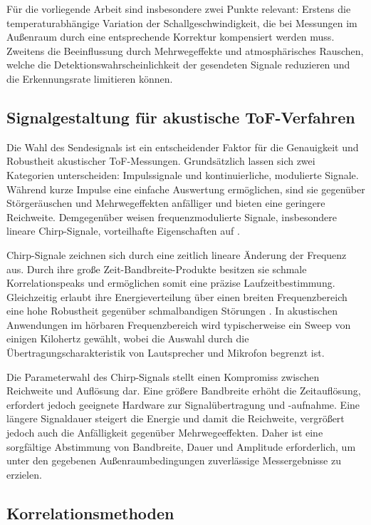 Für die vorliegende Arbeit sind insbesondere zwei Punkte relevant: Erstens die temperaturabhängige Variation der Schallgeschwindigkeit, die bei Messungen im Außenraum durch eine entsprechende Korrektur kompensiert werden muss. Zweitens die Beeinflussung durch Mehrwegeffekte und atmosphärisches Rauschen, welche die Detektionswahrscheinlichkeit der gesendeten Signale reduzieren und die Erkennungsrate limitieren können.


\subsection{Signalgestaltung für akustische \ac{ToF}-Verfahren}

Die Wahl des Sendesignals ist ein entscheidender Faktor für die Genauigkeit und Robustheit akustischer \ac{ToF}-Messungen. Grundsätzlich lassen sich zwei Kategorien unterscheiden: Impulssignale und kontinuierliche, modulierte Signale. Während kurze Impulse eine einfache Auswertung ermöglichen, sind sie gegenüber Störgeräuschen und Mehrwegeffekten anfälliger und bieten eine geringere Reichweite. Demgegenüber weisen frequenzmodulierte Signale, insbesondere lineare Chirp-Signale, vorteilhafte Eigenschaften auf \cite{cook1960pulse}.

Chirp-Signale zeichnen sich durch eine zeitlich lineare Änderung der Frequenz aus. Durch ihre große Zeit-Bandbreite-Produkte besitzen sie schmale Korrelationspeaks und ermöglichen somit eine präzise Laufzeitbestimmung. Gleichzeitig erlaubt ihre Energieverteilung über einen breiten Frequenzbereich eine hohe Robustheit gegenüber schmalbandigen Störungen \cite{winkler1995range}. In akustischen Anwendungen im hörbaren Frequenzbereich wird typischerweise ein Sweep von einigen Kilohertz gewählt, wobei die Auswahl durch die Übertragungscharakteristik von Lautsprecher und Mikrofon begrenzt ist.

Die Parameterwahl des Chirp-Signals stellt einen Kompromiss zwischen Reichweite und Auflösung dar. Eine größere Bandbreite erhöht die Zeitauflösung, erfordert jedoch geeignete Hardware zur Signalübertragung und -aufnahme. Eine längere Signaldauer steigert die Energie und damit die Reichweite, vergrößert jedoch auch die Anfälligkeit gegenüber Mehrwegeeffekten. Daher ist eine sorgfältige Abstimmung von Bandbreite, Dauer und Amplitude erforderlich, um unter den gegebenen Außenraumbedingungen zuverlässige Messergebnisse zu erzielen.


\subsection{Korrelationsmethoden}

